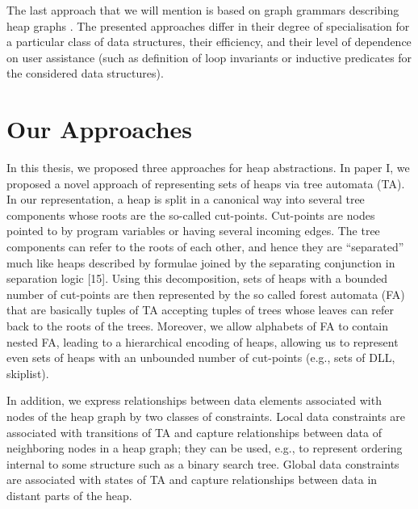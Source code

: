 The last approach that we will mention is based on graph grammars describing heap graphs \cite{Jonathan:Shape, Jonathan:Grammars}.  The presented approaches differ in their degree of specialisation for a particular class of data structures, their efficiency, and their level of dependence on user assistance (such as definition of loop invariants or inductive predicates for the considered data structures).
  
\section*{Our Approaches}
In this thesis, we proposed three approaches for heap abstractions. In paper I, we proposed a novel approach of representing sets of heaps via tree automata (TA). In our representation, a heap is split in a canonical way into several tree components whose roots are the so-called cut-points. Cut-points are nodes pointed to by program variables or having several incoming edges. The tree components can refer to the roots of each other, and hence they are “separated” much like heaps described by formulae joined by the separating conjunction in separation logic [15]. Using this decomposition, sets of heaps with a bounded number of cut-points are then represented by the so called forest automata (FA) that are basically tuples of TA accepting tuples of trees whose leaves can refer back to the roots of the trees. Moreover, we allow alphabets of FA to contain nested FA, leading to a hierarchical encoding of heaps, allowing us to represent even sets of heaps with an unbounded number of cut-points (e.g., sets of DLL, skiplist).
 
 In addition, we express relationships between data elements associated with nodes of the heap graph  by two classes of constraints.
 Local data constraints are associated with transitions of TA  and capture relationships between data of neighboring nodes in a heap graph; they can be used, e.g., to represent ordering internal to some structure  such as a binary search tree. Global data constraints are associated with states of TA and capture relationships between data in distant parts of the heap.
